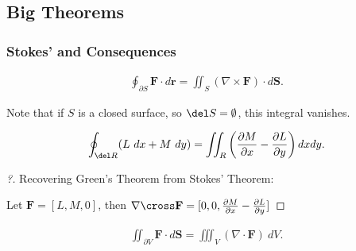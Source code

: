\hypertarget{big-theorems}{%
\subsection{Big Theorems}\label{big-theorems}}

\hypertarget{stokes-and-consequences}{%
\subsubsection{Stokes' and Consequences}\label{stokes-and-consequences}}

\begin{theorem}

\begin{align*}  
\oint _ { \partial S } \mathbf { F } \cdot d \mathbf { r } = \iint _ { S } ( \nabla \times \mathbf { F } ) \cdot d \mathbf { S }
.\end{align*}

\end{theorem}

\begin{remark}

Note that if \(S\) is a closed surface, so \(\del S = \emptyset\), this
integral vanishes.

\end{remark}

\begin{corollary}

\begin{align*}  
\oint _ { \del R } ( L ~d x + M ~d y ) = \iint _ { R } \left( \frac { \partial M } { \partial x } - \frac { \partial L } { \partial y } \right) d x d y
.\end{align*}

\end{corollary}

\begin{proof}[?]

Recovering Green's Theorem from Stokes' Theorem:

Let \(\mathbf{F} = [L, M, 0]\), then
\(\nabla\cross \mathbf{F} = [0, 0, \frac{\partial M}{\partial x} - \frac{\partial L}{\partial y}]\)

\end{proof}

\begin{corollary}

\begin{align*}  
\iint_ { \partial V } \mathbf { F } \cdot d \mathbf { S } = \iiint _ { V } ( \nabla \cdot \mathbf { F } ) ~d V
.\end{align*}

\end{corollary}

